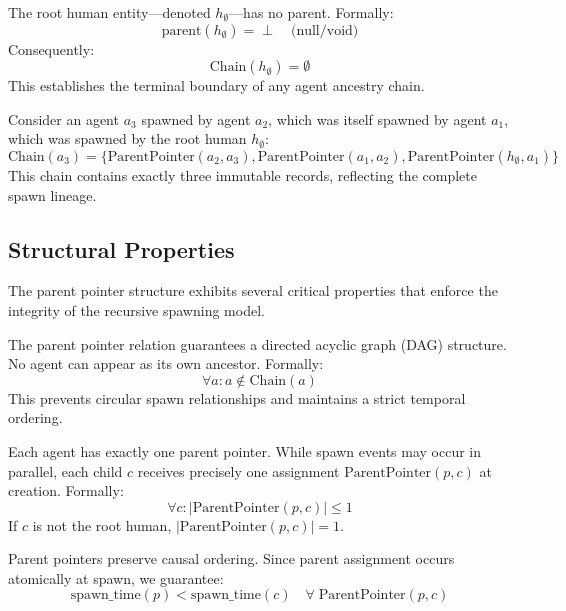 \begin{definition}
The root human entity---denoted $h_\emptyset$---has no parent. Formally:
\[
\text{parent}(h_\emptyset) = \perp \quad \text{(null/void)}
\]
Consequently:
\[
\text{Chain}(h_\emptyset) = \emptyset
\]
This establishes the terminal boundary of any agent ancestry chain.
\end{definition}

\begin{example}
Consider an agent $a_3$ spawned by agent $a_2$, which was itself spawned by agent $a_1$, which was spawned by the root human $h_\emptyset$:
\[
\text{Chain}(a_3) = \{
    \text{ParentPointer}(a_2, a_3),
    \text{ParentPointer}(a_1, a_2),
    \text{ParentPointer}(h_\emptyset, a_1)
\}
\]
This chain contains exactly three immutable records, reflecting the complete spawn lineage.
\end{example}

\subsection{Structural Properties}

The parent pointer structure exhibits several critical properties that enforce the integrity of the recursive spawning model.

\begin{property}[Acyclicity]
The parent pointer relation guarantees a directed acyclic graph (DAG) structure. No agent can appear as its own ancestor. Formally:
\[
\forall a: a \notin \text{Chain}(a)
\]
This prevents circular spawn relationships and maintains a strict temporal ordering.
\end{property}

\begin{property}[Uniqueness]
Each agent has exactly one parent pointer. While spawn events may occur in parallel, each child $c$ receives precisely one assignment $\text{ParentPointer}(p, c)$ at creation. Formally:
\[
\forall c: |\text{ParentPointer}(p, c)| \leq 1
\]
If $c$ is not the root human, $|\text{ParentPointer}(p, c)| = 1$.
\end{property}

\begin{property}
Parent pointers preserve causal ordering. Since parent assignment occurs atomically at spawn, we guarantee:
\[
\text{spawn\_time}(p) < \text{spawn\_time}(c) \quad \forall\; \text{ParentPointer}(p, c)
\]
\end{property}

